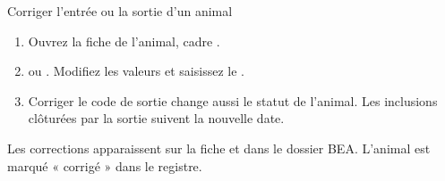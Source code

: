 \documentclass[11pt,a4paper]{article}
\begin{document}
\begin{procedure}{Corriger l'entrée ou la sortie d'un animal}
\begin{enumerate}
  \item Ouvrez la fiche de l'animal, cadre .
  \item {} ou . Modifiez les valeurs et saisissez le .
  \item Corriger le code de sortie change aussi le statut de l'animal. Les
    inclusions clôturées par la sortie suivent la nouvelle date.
\end{enumerate}
\end{procedure}
Les corrections apparaissent sur la fiche et dans le dossier BEA. L'animal
est marqué « corrigé » dans le registre.
\end{document}
